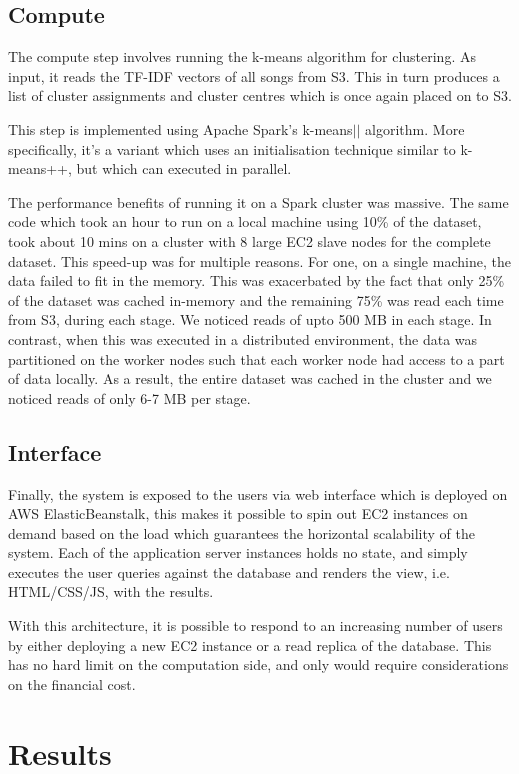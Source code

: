 \documentclass[11pt,a4paper]{scrartcl}
\begin{document}
  \subsection{Compute}
 
  The compute step involves running the k-means algorithm for clustering.
  As input, it reads the TF-IDF vectors of all songs from S3.
  This in turn produces a list of cluster assignments and cluster centres which is 
  once again placed on to S3.
  
  This step is implemented using Apache Spark's k-means$||$ algorithm.
  More specifically, it's a variant which uses an initialisation technique similar to k-means++,
  but which can executed in parallel.
  
  The performance benefits of running it on a Spark cluster was massive.
  The same code which took an hour to run on a local machine using 10\% of the dataset,
  took about 10 mins on a cluster with 8 large EC2 slave nodes for the complete dataset.
  This speed-up was for multiple reasons.
  For one, on a single machine, the data failed to fit in the memory.
  This was exacerbated by the fact that only 25\% of the dataset was cached in-memory and
  the remaining 75\% was read each time from S3, during each stage.
  We noticed reads of upto 500 MB in each stage.
  In contrast, when this was executed in a distributed environment, the data was partitioned on
  the worker nodes such that each worker node had access to a part of data locally.
  As a result, the entire dataset was cached in the cluster and we noticed reads of only
  6-7 MB per stage.
  
  \subsection{Interface}
  
  Finally, the system is exposed to the users via web interface which is deployed
  on AWS ElasticBeanstalk, this makes it possible to spin out EC2 instances on
  demand based on the load which guarantees the horizontal scalability of
  the system. Each of the application server instances holds no state, and simply
  executes the user queries against the database and renders the view, i.e.
  HTML/CSS/JS, with the results.
  
  With this architecture, it is possible to respond to an increasing number of
  users by either deploying a new EC2 instance or a read replica of the
  database. This has no hard limit on the computation side, and only
  would require considerations on the financial cost.
  
  \section{Results}
\end{document}
